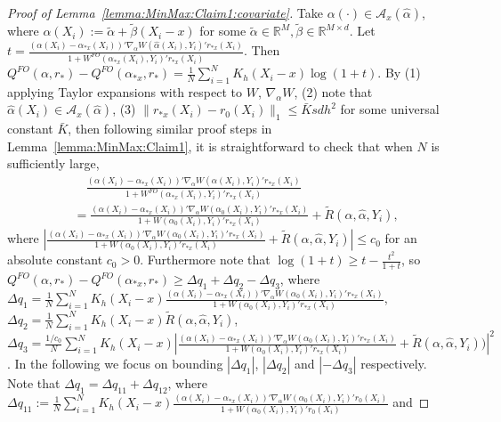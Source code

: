 \documentclass[11pt]{article}
\begin{document}
\begin{proof}[Proof of Lemma~\ref{lemma:MinMax:Claim1:covariate}]
Take $\alpha(\cdot) \in \mathcal{A}_x(\hat\alpha)$, where $\alpha(X_i):=\tilde{\alpha}+\tilde{\beta}(X_i-x)$ for some $\tilde{\alpha}\in\mathbb{R}^M, \tilde{\beta}\in\mathbb{R}^{M\times d}$. Let $t=\frac{(\alpha(X_i) - \alpha_{*x}(X_i))'\nabla_\alpha W(\hat\alpha(X_i),Y_i)'r_{*x}(X_i)}{1+W^{FO}(\alpha_{*x}(X_i),Y_i)'r_{*x}(X_i)}$. Then $Q^{FO}(\alpha,r_*)-Q^{FO}(\alpha_{*x},r_*)=\frac{1}{N}\sum_{i=1}^NK_h(X_i-x) \log\left( 1 + t\right)$. By (1) applying Taylor expansions with respect to $W$, $\nabla_{\alpha}W$, (2) note that $\hat{\alpha}(X_i)\in\mathcal{A}_x(\hat{\alpha})$, (3) $\|r_{*x}(X_i)-r_0(X_i)\|_1\leq\bar{K}sdh^2$ for some universal constant $\bar{K}$, then following similar proof steps in Lemma~\ref{lemma:MinMax:Claim1}, it is straightforward to check that when $N$ is sufficiently large, 
$$\begin{array}{rl}
&\displaystyle\quad\frac{(\alpha(X_i) - \alpha_{*x}(X_i))'\nabla_\alpha W(\hat\alpha(X_i),Y_i)'r_{*x}(X_i)}{1+W^{FO}(\alpha_{*x}(X_i),Y_i)'r_{*x}(X_i)}\\
&\displaystyle=\frac{(\alpha(X_i) - \alpha_{*x}(X_i))'\nabla_\alpha W(\alpha_0(X_i),Y_i)'r_{*x}(X_i)}{1+W(\alpha_0(X_i),Y_i)'r_{*x}(X_i)} +\widetilde R(\alpha,\hat\alpha,Y_i),
\end{array}$$ 
where $\left|\frac{(\alpha(X_i) - \alpha_{*x}(X_i))'\nabla_\alpha W(\alpha_0(X_i),Y_i)'r_{*x}(X_i)}{1+W(\alpha_0(X_i),Y_i)'r_{*x}(X_i)} +\widetilde R(\alpha,\hat\alpha,Y_i)\right|\leq c_0$ for an absolute constant $c_0>0$. Furthermore note that $\log(1+t)\geq t - \frac{t^2}{1+t}$, so 
$Q^{FO}(\alpha,r_*)-Q^{FO}(\alpha_{*x},r_*)\geq \Delta q_1+\Delta q_2-\Delta q_3$, where $\Delta q_1=\frac{1}{N}\sum_{i=1}^NK_h(X_i-x)\frac{(\alpha(X_i) - \alpha_{*x}(X_i))'\nabla_\alpha W(\alpha_0(X_i),Y_i)'r_{*x}(X_i)}{1+W(\alpha_0(X_i),Y_i)'r_{*x}(X_i)}$, $\Delta q_2=\frac{1}{N}\sum_{i=1}^N K_h(X_i-x)\widetilde R(\alpha,\hat\alpha,Y_i)$, $\Delta q_3=\frac{1/c_0}{N}\sum_{i=1}^N K_h(X_i-x)\left|\frac{(\alpha(X_i) - \alpha_{*x}(X_i))'\nabla_\alpha W(\alpha_0(X_i),Y_i)'r_{*x}(X_i)}{1+W(\alpha_0(X_i),Y_i)'r_{*x}(X_i)} +\widetilde R(\alpha,\hat\alpha,Y_i))\right|^2$. In the following we focus on bounding $|\Delta q_1|$, $|\Delta q_2|$ and $|-\Delta q_3|$ respectively. Note that $\Delta q_1=\Delta q_{11}+\Delta q_{12}$, where $\displaystyle\Delta q_{11}:=\frac{1}{N}\sum_{i=1}^N K_h(X_i-x)\frac{(\alpha(X_i) - \alpha_{*x}(X_i))'\nabla_\alpha W(\alpha_0(X_i),Y_i)'r_0(X_i)}{1+W(\alpha_0(X_i),Y_i)'r_0(X_i)}$ and 

\end{proof}
\end{document}
